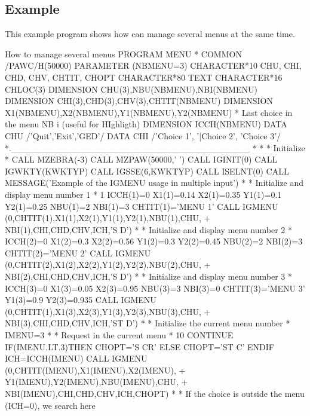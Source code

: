 \subsection{Example}

This example program shows how  can manage
several menus at the same time.

\begin{XMPt}{How to manage several menus}
      PROGRAM MENU
*
      COMMON /PAWC/H(50000)
      PARAMETER (NBMENU=3)
      CHARACTER*10 CHU, CHI, CHD, CHV, CHTIT, CHOPT
      CHARACTER*80 TEXT
      CHARACTER*16 CHLOC(3)
      DIMENSION CHU(3),NBU(NBMENU),NBI(NBMENU)
      DIMENSION CHI(3),CHD(3),CHV(3),CHTIT(NBMENU)
      DIMENSION X1(NBMENU),X2(NBMENU),Y1(NBMENU),Y2(NBMENU)
*     Last choice in the menu NB i (useful for HIghligth)
      DIMENSION ICCH(NBMENU)
      DATA CHU /'Quit','Exit','GED'/
      DATA CHI /'Choice 1', '|Choice 2', 'Choice 3'/
*.______________________________________
*
*
*       Initialize \HIGZ
*
      CALL MZEBRA(-3)
      CALL MZPAW(50000,' ')
      CALL IGINIT(0)
      CALL IGWKTY(KWKTYP)
      CALL IGSSE(6,KWKTYP)
      CALL ISELNT(0)
      CALL MESSAGE('Example of the IGMENU usage in multiple input')
*
*       Initialize and display menu number 1
*
  1   ICCH(1)=0
      X1(1)=0.14
      X2(1)=0.35
      Y1(1)=0.1
      Y2(1)=0.25
      NBU(1)=2
      NBI(1)=3
      CHTIT(1)='MENU 1'
      CALL IGMENU (0,CHTIT(1),X1(1),X2(1),Y1(1),Y2(1),NBU(1),CHU,
     +             NBI(1),CHI,CHD,CHV,ICH,'S   D')
*
*       Initialize and display menu number 2
*
      ICCH(2)=0
      X1(2)=0.3
      X2(2)=0.56
      Y1(2)=0.3
      Y2(2)=0.45
      NBU(2)=2
      NBI(2)=3
      CHTIT(2)='MENU 2'
      CALL IGMENU (0,CHTIT(2),X1(2),X2(2),Y1(2),Y2(2),NBU(2),CHU,
     +             NBI(2),CHI,CHD,CHV,ICH,'S   D')
*
*       Initialize and display menu number 3
*
      ICCH(3)=0
      X1(3)=0.05
      X2(3)=0.95
      NBU(3)=3
      NBI(3)=0
      CHTIT(3)='MENU 3'
      Y1(3)=0.9
      Y2(3)=0.935
      CALL IGMENU (0,CHTIT(1),X1(3),X2(3),Y1(3),Y2(3),NBU(3),CHU,
     +             NBI(3),CHI,CHD,CHV,ICH,'ST  D')
*
*       Initialize the current menu number
*
      IMENU=3
*
*       Request in the current menu
*
   10 CONTINUE
      IF(IMENU.LT.3)THEN
         CHOPT='S   CR'
      ELSE
         CHOPT='ST  C'
      ENDIF
      ICH=ICCH(IMENU)
      CALL IGMENU (0,CHTIT(IMENU),X1(IMENU),X2(IMENU),
     +             Y1(IMENU),Y2(IMENU),NBU(IMENU),CHU,
     +             NBI(IMENU),CHI,CHD,CHV,ICH,CHOPT)
*
*       If the choice is outside the menu (ICH=0), we search here

\end{XMPt}
